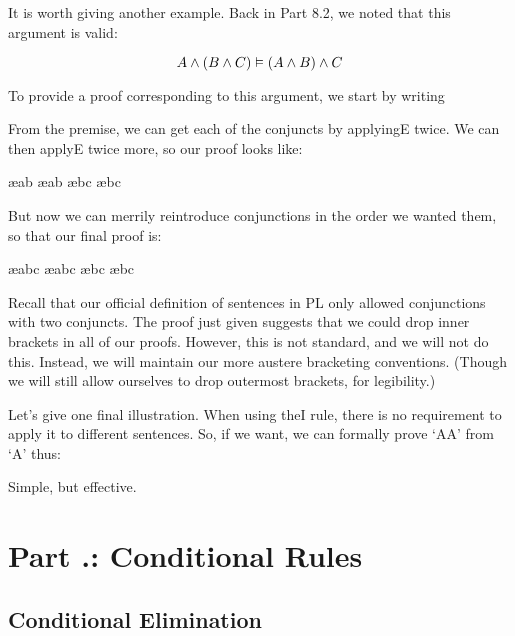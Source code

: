 It is worth giving another example. Back in Part 8.2, we noted that this argument is valid:

$$A\wedge (B\wedge C) \vDash (A\wedge B)\wedge C$$

To provide a proof corresponding to this argument, we start by writing
\begin{fitchproof}
\end{fitchproof}
From the premise, we can get each of the conjuncts by applying\eand E twice. We can then apply\eand E twice more, so our proof looks like:
\begin{fitchproof}
 \ae{ab}
 \ae{ab}
 \ae{bc}
 \ae{bc}
\end{fitchproof}
But now we can merrily reintroduce conjunctions in the order we wanted them, so that our final proof is:
\begin{fitchproof}
 \ae{abc}
 \ae{abc}
 \ae{bc}
 \ae{bc}
\end{fitchproof}

Recall that our official definition of sentences in PL only allowed conjunctions with two conjuncts. The proof just given suggests that we could drop inner brackets in all of our proofs. However, this is not standard, and we will not do this. Instead, we will maintain our more austere bracketing conventions. (Though we will still allow ourselves to drop outermost brackets, for legibility.)

Let’s give one final illustration. When using the\eand I rule, there is no requirement to apply it to different sentences. So, if we want, we can formally prove ‘A\eand  A’ from ‘A’ thus:

\begin{fitchproof}
\end{fitchproof}
Simple, but effective.

\section{Part \thechapcount.\theseccount: Conditional Rules}\label{chap.conditionalrules}

\subsection{Conditional Elimination}

